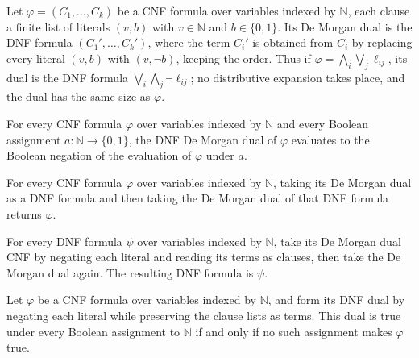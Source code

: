 \begin{definition}
\label{Std.Sat.CNF.dual}
\leanok
{}
Let $\varphi = (C_1, \dots, C_k)$ be a CNF formula over variables indexed by $\mathbb{N}$,
each clause a finite list of literals $(v,b)$ with $v \in \mathbb{N}$ and
$b \in \{0,1\}$. Its De Morgan dual is the DNF formula $(C_1', \dots, C_k')$, where the
term $C_i'$ is obtained from $C_i$ by replacing every literal $(v,b)$ with $(v, \neg b)$,
keeping the order. Thus if $\varphi = \bigwedge_i \bigvee_j \ell_{ij}$, its dual is the DNF
formula $\bigvee_i \bigwedge_j \neg\ell_{ij}$; no distributive expansion takes place, and
the dual has the same size as $\varphi$.
\end{definition}

\begin{theorem}
\label{Std.Sat.CNF.eval_dual}
\leanok
{}
For every CNF formula $\varphi$ over variables indexed by $\mathbb{N}$ and every Boolean
assignment $a:\mathbb{N}\to\{0,1\}$, the DNF De Morgan dual of $\varphi$ evaluates to
the Boolean negation of the evaluation of $\varphi$ under $a$.
\end{theorem}

\begin{theorem}
\label{Std.Sat.CNF.dual_dual}
\leanok
{}
For every CNF formula $\varphi$ over variables indexed by $\mathbb{N}$, taking its De
Morgan dual as a DNF formula and then taking the De Morgan dual of that DNF formula
returns $\varphi$.
\end{theorem}

\begin{theorem}
\label{Std.Sat.DNF.dual_dual}
\leanok
{}
For every DNF formula $\psi$ over variables indexed by $\mathbb{N}$, take its De Morgan
dual CNF by negating each literal and reading its terms as clauses, then take the De
Morgan dual again. The resulting DNF formula is $\psi$.
\end{theorem}

\begin{theorem}
\label{Std.Sat.CNF.tautology_dual_iff}
\leanok
{}
Let $\varphi$ be a CNF formula over variables indexed by $\mathbb{N}$, and form its DNF
dual by negating each literal while preserving the clause lists as terms. This dual is
true under every Boolean assignment to $\mathbb{N}$ if and only if no such assignment
makes $\varphi$ true.
\end{theorem}
